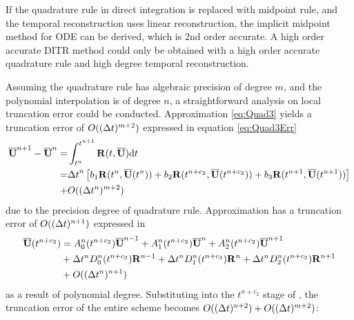 \documentclass[preprint,12pt]{elsarticle}
\begin{document}
If the quadrature rule in direct integration is replaced with
midpoint rule, and the temporal reconstruction uses linear
reconstruction, the implicit midpoint method for ODE can be derived,
which is 2nd order accurate. A high order accurate DITR method could
only be obtained with a high order accurate quadrature rule and 
high degree temporal reconstruction.

Assuming the quadrature rule has algebraic precision
of degree $m$, and the polynomial interpolation is of degree $n$,
a straightforward analysis on local truncation error could be conducted.
Approximation \eqref{eq:Quad3} yields a
truncation error of $O((\mathrm\Delta t)^{m+2} )$ expressed in equation \eqref{eq:Quad3Err}
\begin{equation}
    \label{eq:Quad3Err}
    \begin{aligned}
        \overline{\mathbf{U}}^{n+1} - \overline{\mathbf{U}}^{n} = & \int_{t^n}^{t^{n+1}}{
        \mathbf{R}(t, \overline{\mathbf{U}})\dd t}                              \\  = &
        {\mathrm\Delta t}^{n}
        \left[
            b_1\mathbf{R}(t^n, \overline{\mathbf{U}}(t^n))
            +
            b_2\mathbf{R}(t^{n+c_2}, \overline{\mathbf{U}}(t^{n+c_2}))
            +
            b_3\mathbf{R}(t^{n+1}, \overline{\mathbf{U}}(t^{n+1}))
            \right]
        \\ + &
        O((\mathrm\Delta t^{n})^{m+2} )
    \end{aligned}
\end{equation}
due to the precision degree of quadrature rule.
Approximation
 has a truncation error of $O((\mathrm\Delta t)^{n+1})$
expressed in 
\begin{equation}
    \begin{aligned}
        \label{eq:TRErr}
        \overline{\mathbf{U}}(t^{n+c_2}) & =
        A^n_0(t^{n+c_2})\overline{\mathbf{U}}^{n - 1} +
        A^n_1(t^{n+c_2})\overline{\mathbf{U}}^{n} +
        A^n_2(t^{n+c_2})\overline{\mathbf{U}}^{n + 1}
        \\ & +
        \mathrm\Delta t^n D^n_0(t^{n+c_2})\mathbf{R}^{n - 1} +
        \mathrm\Delta t^n D^n_1(t^{n+c_2})\mathbf{R}^{n} +
        \mathrm\Delta t^n D^n_2(t^{n+c_2})\mathbf{R}^{n + 1}
        \\ & +
        O((\mathrm\Delta t^{n})^{n+1} )
    \end{aligned}
\end{equation}
as a result of polynomial degree.
Substituting  into the $t^{n+c_2}$ stage
of , the truncation error
of the entire scheme becomes $O((\mathrm\Delta t)^{n+2}) + O((\mathrm\Delta t)^{m+2})$:
\end{document}
